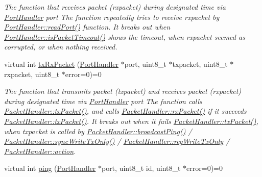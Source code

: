 \begin{DoxyCompactItemize}
\begin{DoxyCompactList}\small\item\em The function that receives packet (rxpacket) during designated time via \hyperlink{classmercury_1_1_port_handler}{Port\+Handler} port  The function repeatedly tries to receive rxpacket by \hyperlink{classmercury_1_1_port_handler_afa6f52d7b95c5ffd8f0c92477d517c79}{Port\+Handler\+::read\+Port()} function.  It breaks out  when \hyperlink{classmercury_1_1_port_handler_a6733438255ede3d34738842e10cd8fc2}{Port\+Handler\+::is\+Packet\+Timeout()} shows the timeout,  when rxpacket seemed as corrupted, or  when nothing received. \end{DoxyCompactList}\item 
virtual int \hyperlink{classmercury_1_1_packet_handler_ac7ceeaec210827d119199144badaad3a}{tx\+Rx\+Packet} (\hyperlink{classmercury_1_1_port_handler}{Port\+Handler} $\ast$port, uint8\+\_\+t $\ast$txpacket, uint8\+\_\+t $\ast$rxpacket, uint8\+\_\+t $\ast$error=0)=0
\begin{DoxyCompactList}\small\item\em The function that transmits packet (txpacket) and receives packet (rxpacket) during designated time via \hyperlink{classmercury_1_1_port_handler}{Port\+Handler} port  The function calls \hyperlink{classmercury_1_1_packet_handler_acc3f84f0d952dc2d827d8500de512abe}{Packet\+Handler\+::tx\+Packet()},  and calls \hyperlink{classmercury_1_1_packet_handler_a01a3929c3514eac14b4ca5a61b498e20}{Packet\+Handler\+::rx\+Packet()} if it succeeds \hyperlink{classmercury_1_1_packet_handler_acc3f84f0d952dc2d827d8500de512abe}{Packet\+Handler\+::tx\+Packet()}.  It breaks out  when it fails \hyperlink{classmercury_1_1_packet_handler_acc3f84f0d952dc2d827d8500de512abe}{Packet\+Handler\+::tx\+Packet()},  when txpacket is called by \hyperlink{classmercury_1_1_packet_handler_aae8b5fb10e57973884589a0318e30fad}{Packet\+Handler\+::broadcast\+Ping()} / \hyperlink{classmercury_1_1_packet_handler_aa4c16ce358c78638f49f6dc1b5b141bd}{Packet\+Handler\+::sync\+Write\+Tx\+Only()} / \hyperlink{classmercury_1_1_packet_handler_a0b0daaabd6473e14b2fbfbbf3260bc7b}{Packet\+Handler\+::reg\+Write\+Tx\+Only} / \hyperlink{classmercury_1_1_packet_handler_a2ce31bd650d032c4bff957c9e453f38e}{Packet\+Handler\+::action}. \end{DoxyCompactList}\item 
virtual int \hyperlink{classmercury_1_1_packet_handler_a5fce347ac1f55de301e50bac01c58f4f}{ping} (\hyperlink{classmercury_1_1_port_handler}{Port\+Handler} $\ast$port, uint8\+\_\+t id, uint8\+\_\+t $\ast$error=0)=0

\end{DoxyCompactItemize}
